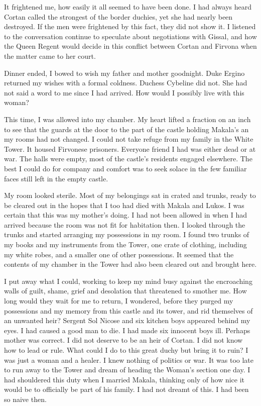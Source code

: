 \documentclass{article}
\begin{document}
It frightened me, how easily it all seemed to have been done. I had always heard Cortan called the strongest of the border duchies, yet she had nearly been destroyed. If the men were frightened by this fact, they did not show it. I listened to the conversation continue to speculate about negotiations with Gissal, and how the Queen Regent would decide in this conflict between Cortan and Firvona when the matter came to her court. 

Dinner ended, I bowed to wish my father and mother goodnight. Duke Ergino returned my wishes with a formal coldness. Duchess Cybeline did not. She had not said a word to me since I had arrived. How would I possibly live with this woman?

This time, I was allowed into my chamber. My heart lifted a fraction on an inch to see that the guards at the door to the part of the castle holding Makala's an my rooms had not changed. I could not take refuge from my family in the White Tower. It housed Firvonese prisoners. Everyone friend I had was either dead or at war. The halls were empty, most of the castle's residents engaged elsewhere. The best I could do for company and comfort was to seek solace in the few familiar faces still left in the empty castle. 

My room looked sterile. Most of my belongings sat in crated and trunks, ready to be cleared out in the hopes that I too had died with Makala and Lukos. I was certain that this was my mother's doing. I had not been allowed in when I had arrived because the room was not fit for habitation then. I looked through the trunks and started arranging my possessions in my room. I found two trunks of my books and my instruments from the Tower, one crate of clothing, including my white robes, and a smaller one of other possessions. It seemed that the contents of my chamber in the Tower had also been cleared out and brought here. 

I put away what I could, working to keep my mind busy against the encroaching walls of guilt, shame, grief and desolation that threatened to smother me. How long would they wait for me to return, I wondered, before they purged my possessions and my memory from this castle and its tower, and rid themselves of an unwanted heir? Sergent Sol Nicose and six kitchen boys appeared behind my eyes. I had caused a good man to die. I had made six innocent boys ill. Perhaps mother was correct. I did not deserve to be an heir of Cortan. I did not know how to lead or rule. What could I do to this great duchy but bring it to ruin? I was just a woman and a healer. I knew nothing of politics or war. It was too late to run away to the Tower and dream of heading the Woman's section one day. I had shouldered this duty when I married Makala, thinking only of how nice it would be to officially be part of his family. I had not dreamt of this. I had been so naive then.
\end{document}
